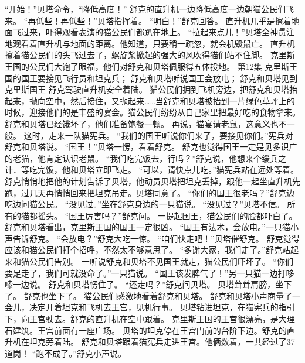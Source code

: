 \documentclass[a4paper,12pt,UTF8,twoside]{ctexbook}
\begin{document}
        “开始！”贝塔命令，“降低高度！” 
        舒克的直升机一边降低高度一边朝猫公民们飞来。 
        “再低些！再低些！”贝塔指挥着。 
        “明白！”舒克回答。 
        直升机几乎是擦着地面飞过来，吓得观看表演的猫公民们都趴在地上。 
        “拉起来点儿！”贝塔全神贯注地观看着直升机与地面的距离。他知道，只要稍一疏忽，就会机毁鼠亡。 
        直升机擦着猫公民们的头飞过去了，螺旋桨掀起的强大的风吹得猫们站不住脚。 
        克里斯王国的公民们大饱了眼福，他们对舒克和贝塔佩服得五体投地。   第12集 
        克里斯王国的国王要接见飞行员和坦克兵； 
        舒克和贝塔听说国王会放电； 
        舒克和贝塔见到克里斯国王   
        舒克驾驶直升机安全着陆。 
        猫公民们拥到飞机旁边，把舒克和贝塔抬起来，抛向空中，然后接住，又抛起来……当舒克和贝塔被抬到一片绿色草坪上的时候，迎接他们的是丰盛的宴会。猫公民们纷纷从自己家里把最好吃的食物拿来。舒克和贝塔已经饿坏了，他们准备饱餐一顿。 
        再说，猫宴请老鼠，这意义也不一般。 
        这时，走来一队猫宪兵。 
        “我们的国王听说你们来了，要接见你们。”宪兵对舒克和贝塔说。 
        “国王！”贝塔一愣，看着舒克。 
        舒克也觉得国王一定是见多识广的老猫，他肯定认识老鼠。 
        “我们吃完饭去，行吗？”舒克说，他想来个缓兵之计．等吃完饭，他和贝塔立即飞走。 
        “可以，请快点儿吃。”猫宪兵站在远处等着。 
        舒克悄悄地把他的计划告诉了贝塔，他动员贝塔把坦克丢掉，跟他一起坐直升机先跑，过几天再悄悄回来把坦克吊走。贝塔同意了。 
        “你们的国王很老吗？”舒克边吃边问猫公民。 
        “没见过。”坐在舒克身边的一只猫说。 
        “没见过？”贝塔不信。 
        所有的猫都摇头。 
        “国王厉害吗？”舒克问。 
        一提起国王，猫公民们的脸都吓白了。舒克和贝塔看出，克里斯王国的国王一定很凶。 
        “国王有法术，会放电。”一只猫小声告诉舒克。 
        “会放电？”舒克大吃一惊。 
        “咱们快走吧！”贝塔催舒克。 
        舒克觉得应该和猫公民们打个招呼，不然太不够意思了。 
        “多谢大家，我们走了。”舒克站起来和猫公民们告别。 
        一听说舒克和贝塔不见国王就走，猫公民们吓坏了。 
        “你们要足走了，我们可就没命了。”一只猫说。 
        “国王该发脾气了！”另一只猫一边打哆嗦一边说。 
        舒克和贝塔愣住了。 
        “还走吗？”舒克问贝塔。 
        贝塔耸耸肩膀，坐下了。 
        舒克也坐下了。 
        猫公民们感激地看着舒克和贝塔。 
        舒克和贝塔小声商量了一会儿，决定开着坦克和飞机去王宫，见机行事。 
        贝塔钻进坦克，在猫宪兵的指引下，向王宫驶去。舒克的直升机在空中跟着。 
        克里斯王国的王宫很漂亮，是大理石建筑。王宫前面有一座广场。 
        贝塔的坦克停在王宫门前的台阶下边。舒克的直升机在坦克旁着陆。 
        舒克和贝塔跟着猫宪兵走进王宫。他俩数着，一共经过了37道岗！ 
        “跑不成了。”舒克小声说。 
\end{document}
